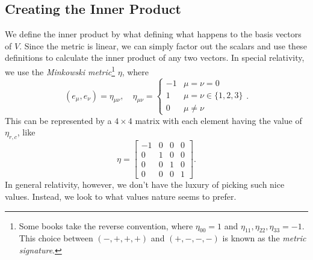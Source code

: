 \subsection{Creating the Inner Product}
We define the inner product by what defining what happens to the basis vectors of $V$.
Since the metric is linear, we can simply factor out the scalars and use these definitions to calculate the inner product of any two vectors.
In special relativity, we use the \emph{Minkowski metric}\footnote{Some books take the reverse convention, where $\eta_{00} = 1$ and $\eta_{11}, \eta_{22}, \eta_{33} = -1$. This choice between $(-,+,+,+)$ and $(+,-,-,-)$ is known as the \emph{metric signature}.} $\eta$, where 
\[ (e_\mu,e_\nu) = \eta_{\mu\nu},\quad \eta_{\mu\nu} = 
    \begin{cases}
        -1 & \mu = \nu = 0 \\
        1 & \mu = \nu \in \{1,2,3\} \\
        0 & \mu \not= \nu
    \end{cases}.
\]
This can be represented by a $4\times4$ matrix with each element having the value of $\eta_{r,c}$, like
\[
	\eta = 
    \begin{bmatrix}
        -1 & 0 & 0 & 0 \\
         0 & 1 & 0 & 0 \\
         0 & 0 & 1 & 0 \\
         0 & 0 & 0 & 1
    \end{bmatrix}.
\]
In general relativity, however, we don't have the luxury of picking such nice values.
Instead, we look to what values nature seems to prefer.
